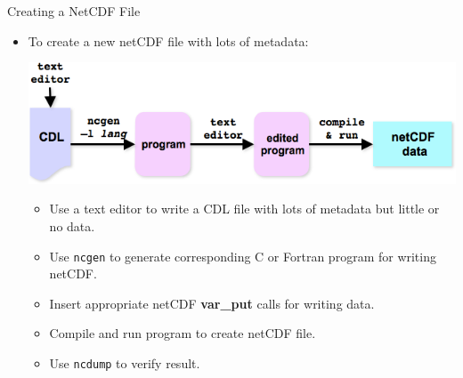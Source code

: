\documentclass[compress,11pt,xcolor=svgnames,aspectratio=169]{beamer}
\begin{document}
\begin{frame}[fragile]{Creating a NetCDF File}

\begin{itemize}
  \item To create a new netCDF file with lots of metadata:\\[0.3cm]

\begin{center}
\includegraphics[scale=0.5]{fig/nc-creat}
\end{center}

    \begin{itemize}
    \setlength\itemsep{0.1cm}
      \item Use a text editor to write a CDL file with lots of metadata but little or no data.
      \item Use \texttt{ncgen} to generate corresponding C or Fortran program for writing netCDF.
      \item Insert appropriate netCDF \textbf{var\_put} calls for writing data.
      \item Compile and run program to create netCDF file.
      \item Use \texttt{ncdump} to verify result.
    \end{itemize}

\end{itemize}

\end{frame}
\end{document}
